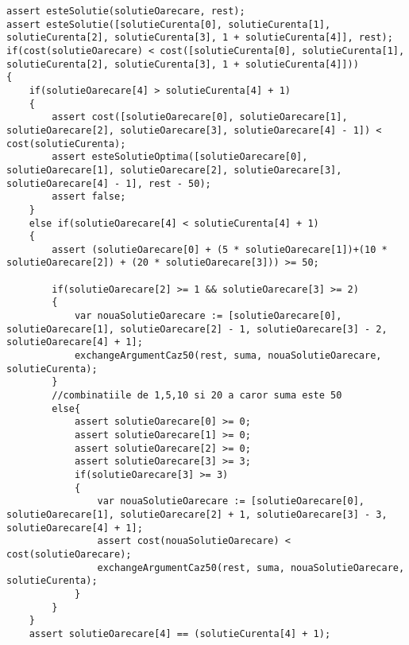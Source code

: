 \begin{enumerate}
\begin{lstlisting}
assert esteSolutie(solutieOarecare, rest);
assert esteSolutie([solutieCurenta[0], solutieCurenta[1], solutieCurenta[2], solutieCurenta[3], 1 + solutieCurenta[4]], rest);
if(cost(solutieOarecare) < cost([solutieCurenta[0], solutieCurenta[1], solutieCurenta[2], solutieCurenta[3], 1 + solutieCurenta[4]]))
{
	if(solutieOarecare[4] > solutieCurenta[4] + 1)
	{
		assert cost([solutieOarecare[0], solutieOarecare[1], solutieOarecare[2], solutieOarecare[3], solutieOarecare[4] - 1]) < cost(solutieCurenta);
		assert esteSolutieOptima([solutieOarecare[0], solutieOarecare[1], solutieOarecare[2], solutieOarecare[3], solutieOarecare[4] - 1], rest - 50);
		assert false;
	}
	else if(solutieOarecare[4] < solutieCurenta[4] + 1)
	{
		assert (solutieOarecare[0] + (5 * solutieOarecare[1])+(10 * solutieOarecare[2]) + (20 * solutieOarecare[3])) >= 50;
		
		if(solutieOarecare[2] >= 1 && solutieOarecare[3] >= 2)
		{
			var nouaSolutieOarecare := [solutieOarecare[0], solutieOarecare[1], solutieOarecare[2] - 1, solutieOarecare[3] - 2, solutieOarecare[4] + 1];
			exchangeArgumentCaz50(rest, suma, nouaSolutieOarecare, solutieCurenta);
		}
		//combinatiile de 1,5,10 si 20 a caror suma este 50
		else{
			assert solutieOarecare[0] >= 0;
			assert solutieOarecare[1] >= 0;
			assert solutieOarecare[2] >= 0;
			assert solutieOarecare[3] >= 3;
			if(solutieOarecare[3] >= 3)
			{
				var nouaSolutieOarecare := [solutieOarecare[0], solutieOarecare[1], solutieOarecare[2] + 1, solutieOarecare[3] - 3, solutieOarecare[4] + 1];
				assert cost(nouaSolutieOarecare) < cost(solutieOarecare);
				exchangeArgumentCaz50(rest, suma, nouaSolutieOarecare, solutieCurenta);
			}
		}
	}
	assert solutieOarecare[4] == (solutieCurenta[4] + 1);


\end{lstlisting}
\end{enumerate}
